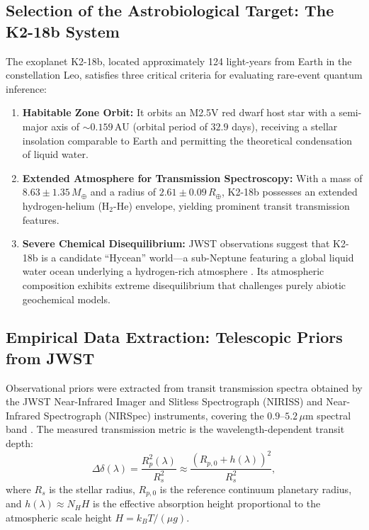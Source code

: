 \subsection{Selection of the Astrobiological Target: The K2-18b System}
The exoplanet K2-18b, located approximately 124 light-years from Earth in the constellation Leo, satisfies three critical criteria for evaluating rare-event quantum inference:
\begin{enumerate}
    \item \textbf{Habitable Zone Orbit:} It orbits an M2.5V red dwarf host star with a semi-major axis of $\sim 0.159\,\mathrm{AU}$ (orbital period of $32.9$ days), receiving a stellar insolation comparable to Earth and permitting the theoretical condensation of liquid water.
    \item \textbf{Extended Atmosphere for Transmission Spectroscopy:} With a mass of $8.63 \pm 1.35\,M_\oplus$ and a radius of $2.61 \pm 0.09\,R_\oplus$, K2-18b possesses an extended hydrogen-helium ($\mathrm{H}_2\text{-}\mathrm{He}$) envelope, yielding prominent transit transmission features.
    \item \textbf{Severe Chemical Disequilibrium:} JWST observations suggest that K2-18b is a candidate ``Hycean'' world---a sub-Neptune featuring a global liquid water ocean underlying a hydrogen-rich atmosphere \cite{madhusudhan2023}. Its atmospheric composition exhibits extreme disequilibrium that challenges purely abiotic geochemical models.
\end{enumerate}

\subsection{Empirical Data Extraction: Telescopic Priors from JWST}
Observational priors were extracted from transit transmission spectra obtained by the JWST Near-Infrared Imager and Slitless Spectrograph (NIRISS) and Near-Infrared Spectrograph (NIRSpec) instruments, covering the $0.9$--$5.2\,\mu\text{m}$ spectral band \cite{madhusudhan2023}. The measured transmission metric is the wavelength-dependent transit depth:
\begin{equation}
\Delta \delta(\lambda) = \frac{R_p^2(\lambda)}{R_s^2} \approx \frac{\left(R_{p,0} + h(\lambda)\right)^2}{R_s^2},
\label{eq:transit_depth_formula}
\end{equation}
where $R_s$ is the stellar radius, $R_{p,0}$ is the reference continuum planetary radius, and $h(\lambda) \approx N_H H$ is the effective absorption height proportional to the atmospheric scale height $H = k_B T / (\mu g)$.

